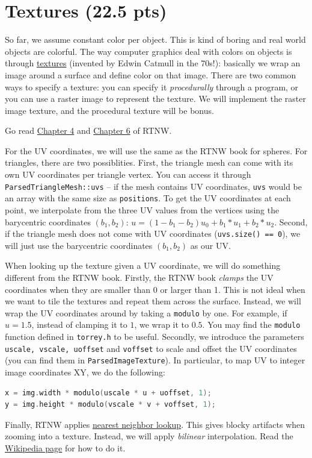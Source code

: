 \section{Textures (22.5 pts)}
So far, we assume constant color per object. This is kind of boring and real world objects are {\color{red}c}{\color{orange}o}{\color{green}l}{\color{blue}o}{\color{cyan}r}f{\color{magenta}u}{\color{violet}l}. The way computer graphics deal with colors on objects is through \href{https://en.wikipedia.org/wiki/Texture_mapping}{textures} (invented by Edwin Catmull in the 70s!): basically we wrap an image around a surface and define color on that image. There are two common ways to specify a texture: you can specify it \emph{procedurally} through a program, or you can use a raster image to represent the texture. We will implement the raster image texture, and the procedural texture will be bonus.

Go read \href{https://raytracing.github.io/books/RayTracingTheNextWeek.html#solidtextures}{Chapter 4} and \href{https://raytracing.github.io/books/RayTracingTheNextWeek.html#imagetexturemapping}{Chapter 6} of RTNW.

For the UV coordinates, we will use the same as the RTNW book for spheres. For triangles, there are two possiblities. First, the triangle mesh can come with its own UV coordinates per triangle vertex. You can access it through \lstinline{ParsedTriangleMesh::uvs} -- if the mesh contains UV coordinates, \lstinline{uvs} would be an array with the same size as \lstinline{positions}. To get the UV coordinates at each point, we interpolate from the three UV values from the vertices using the barycentric coordinates $(b_1, b_2)$: $u = (1 - b_1 - b_2)u_0 + b_1 * u_1 + b_2 * u_2$.
Second, if the triangle mesh does not come with UV coordinates (\lstinline{uvs.size() == 0}), we will just use the barycentric coordinates $(b_1, b_2)$ as our UV.

When looking up the texture given a UV coordinate, we will do something different from the RTNW book. Firstly, the RTNW book \emph{clamps} the UV coordinates when they are smaller than 0 or larger than 1. This is not ideal when we want to tile the textures and repeat them across the surface. Instead, we will wrap the UV coordinates around by taking a \lstinline{modulo} by one. For example, if $u = 1.5$, instead of clamping it to $1$, we wrap it to $0.5$. You may find the \lstinline{modulo} function defined in \lstinline{torrey.h} to be useful. Secondly, we introduce the parameters \lstinline{uscale, vscale, uoffset} and \lstinline{voffset} to scale and offset the UV coordinates (you can find them in \lstinline{ParsedImageTexture}). In particular, to map UV to integer image coordinates XY, we do the following:
\begin{lstlisting}[language=C++]
x = img.width * modulo(uscale * u + uoffset, 1);
y = img.height * modulo(vscale * v + voffset, 1);
\end{lstlisting}
Finally, RTNW applies \href{https://en.wikipedia.org/wiki/Nearest-neighbor_interpolation}{nearest neighbor lookup}. This gives blocky artifacts when zooming into a texture. Instead, we will apply \emph{bilinear} interpolation. Read the \href{https://en.wikipedia.org/wiki/Bilinear_interpolation}{Wikipedia page} for how to do it.

